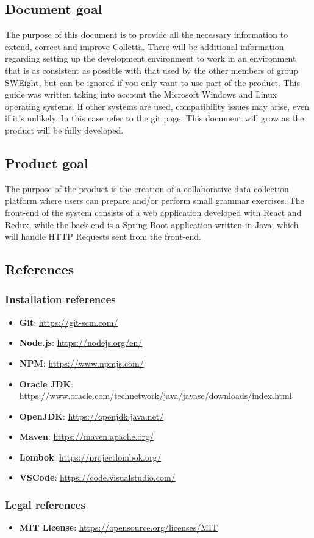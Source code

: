 \subsection{Document goal}
The purpose of this document is to provide all the necessary information to extend, correct and improve Colletta.
There will be additional information regarding setting up the development environment to work in an environment that is as consistent as possible with that used
by the other members of group SWEight, but can be ignored if you only want to use part of the product.
This guide was written taking into account the Microsoft Windows and Linux operating systems. If other systems are used, compatibility issues may arise, even if it's unlikely. In this case refer to the git page. This document will grow as the product will be fully
developed.

\subsection{Product goal}
The purpose of the product is the creation of a collaborative data collection platform where users can prepare and/or perform small grammar exercises. 
The front-end of the system consists of a web application developed with React and Redux, while the back-end is a Spring Boot application written in Java, which will handle HTTP Requests sent from the front-end. 

\subsection{References}


\subsubsection{Installation references}

\begin{itemize}
\item \textbf{Git}: \url{https://git-scm.com/}
\item \textbf{Node.js}: \url{https://nodejs.org/en/}
\item \textbf{NPM}: \url{https://www.npmjs.com/}
\item \textbf{Oracle JDK}: \url{https://www.oracle.com/technetwork/java/javase/downloads/index.html}
\item \textbf{OpenJDK}: \url{https://openjdk.java.net/}
\item \textbf{Maven}: \url{https://maven.apache.org/}
\item \textbf{Lombok}: \url{https://projectlombok.org/}
\item \textbf{VSCode}: \url{https://code.visualstudio.com/} 

\end{itemize}

\subsubsection{Legal references}
\begin{itemize}
\item \textbf{MIT License}: \url{https://opensource.org/licenses/MIT}
\end{itemize}

